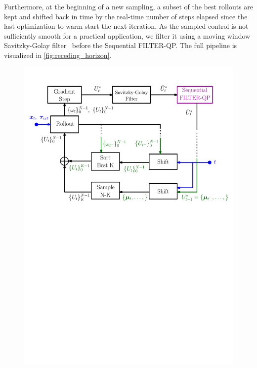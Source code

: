 Furthermore, at the beginning of a new sampling, a subset of the best rollouts are kept and shifted back in time by the real-time number of steps elapsed since the last optimization to warm start the next iteration. 
As the sampled control is not sufficiently smooth for a practical application, we filter it using a moving window Savitzky-Golay filter~\cite{gorry1990general} before the Sequential FILTER-QP.  The full pipeline is visualized in \fig \ref{fig:receding_horizon}.

\begin{figure}[t]
    \centering
    \includegraphics[width=\columnwidth]{figures/schemes/receding_horizon.pdf}

\end{figure}
